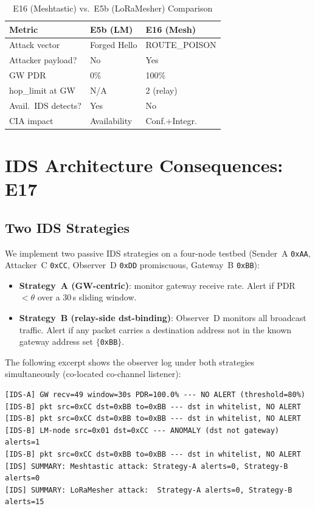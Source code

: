 \documentclass[journal]{IEEEtran}
\begin{document}
\begin{table}[h]
  \centering
  \caption{E16 (Meshtastic) vs.\ E5b (LoRaMesher) Comparison}
  \label{tab:e16e5b}
  \begin{tabular}{p{2.2cm}p{2.1cm}p{2.1cm}}
    \toprule
    Metric & E5b (LM) & E16 (Mesh) \\
    \midrule
    Attack vector & Forged Hello & ROUTE\_POISON \\
    Attacker payload? & No & Yes \\
    GW PDR & 0\% & 100\% \\
    hop\_limit at GW & N/A & 2 (relay) \\
    Avail.\ IDS detects? & Yes & No \\
    CIA impact & Availability & Conf.+Integr. \\
    \bottomrule
  \end{tabular}
\end{table}

\section{IDS Architecture Consequences: E17}
\label{sec:e17}

\subsection{Two IDS Strategies}

We implement two passive IDS strategies on a four-node testbed
(Sender~A \texttt{0xAA}, Attacker~C \texttt{0xCC},
Observer~D \texttt{0xDD} promiscuous, Gateway~B \texttt{0xBB}):

\begin{itemize}
  \item \textbf{Strategy~A (GW-centric)}: monitor gateway receive rate.
    Alert if PDR $< \theta$ over a 30\,s sliding window.
  \item \textbf{Strategy~B (relay-side dst-binding)}: Observer~D monitors
    all broadcast traffic. Alert if any packet carries a destination address
    not in the known gateway address set $\{$\texttt{0xBB}$\}$.
\end{itemize}

The following excerpt shows the observer log under both strategies
simultaneously (co-located co-channel listener):

\begin{lstlisting}[caption={E17 serial log --- observer node (Strategy B)}]
[IDS-A] GW recv=49 window=30s PDR=100.0% --- NO ALERT (threshold=80%)
[IDS-B] pkt src=0xCC dst=0xBB to=0xBB --- dst in whitelist, NO ALERT
[IDS-B] pkt src=0xCC dst=0xBB to=0xBB --- dst in whitelist, NO ALERT
[IDS-B] LM-node src=0x01 dst=0xCC --- ANOMALY (dst not gateway) alerts=1
[IDS-B] pkt src=0xCC dst=0xBB to=0xBB --- dst in whitelist, NO ALERT
[IDS] SUMMARY: Meshtastic attack: Strategy-A alerts=0, Strategy-B alerts=0
[IDS] SUMMARY: LoRaMesher attack:  Strategy-A alerts=0, Strategy-B alerts=15
\end{lstlisting}
\end{document}
